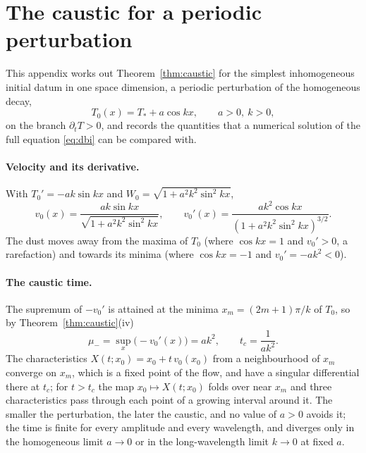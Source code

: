 \section{The caustic for a periodic perturbation}\label{app:dust}

This appendix works out Theorem~\ref{thm:caustic} for the simplest inhomogeneous initial datum in one space dimension, a periodic perturbation of the homogeneous decay,
\begin{equation}\label{eq:cosdatum}
T_0(x) = T_* + a\cos kx,\qquad a>0,\ k>0 ,
\end{equation}
on the branch $\partial_t T>0$, and records the quantities that a numerical solution of the full equation \eqref{eq:dbi} can be compared with.

\paragraph*{Velocity and its derivative.} With $T_0' = -ak\sin kx$ and $W_0 = \sqrt{1+a^2k^2\sin^2kx}$,
\begin{equation}
v_0(x) = \frac{ak\sin kx}{\sqrt{1+a^2k^2\sin^2 kx}},\qquad
v_0'(x) = \frac{ak^2\cos kx}{(1+a^2k^2\sin^2kx)^{3/2}} .
\end{equation}
The dust moves away from the maxima of $T_0$ (where $\cos kx=1$ and $v_0'>0$, a rarefaction) and towards its minima (where $\cos kx = -1$ and $v_0' = -ak^2<0$).

\paragraph*{The caustic time.} The supremum of $-v_0'$ is attained at the minima $x_m = (2m+1)\pi/k$ of $T_0$, so by Theorem~\ref{thm:caustic}(iv)
\begin{equation}\label{eq:tccos}
\mu_- = \sup_x\bigl(-v_0'(x)\bigr) = ak^2, \qquad t_c = \frac{1}{a k^2} .
\end{equation}
The characteristics $X(t;x_0) = x_0 + t\,v_0(x_0)$ from a neighbourhood of $x_m$ converge on $x_m$, which is a fixed point of the flow, and have a singular differential there at $t_c$; for $t>t_c$ the map $x_0\mapsto X(t;x_0)$ folds over near $x_m$ and three characteristics pass through each point of a growing interval around it. The smaller the perturbation, the later the caustic, and no value of $a>0$ avoids it; the time is finite for every amplitude and every wavelength, and diverges only in the homogeneous limit $a\to0$ or in the long-wavelength limit $k\to0$ at fixed $a$.

